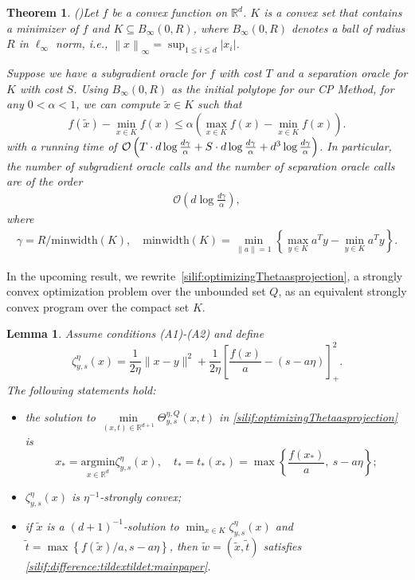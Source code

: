 \documentclass[11pt,letterpaper]{article}
\newcommand{\R}{\mathbb{R}}
\newcommand{\norm}[1]{\left\lVert #1 \right\rVert}
\newcommand{\abs}[1]{\left\vert #1 \right\rvert}
\newcommand{\argmin}{\mathrm{argmin}  }
\newcommand{\brac}[1]{\left( #1\right)}
\newtheorem{theorem}[thm]{Theorem}
\newtheorem{lemma}[thm]{Lemma}
\begin{document}
\begin{theorem}(\cite[Theorem~C.1]{jiang2020cuttingplane})\label{theo:jiang} Let $f$ be a convex function on $\R^d$. $K$ is a convex set that contains a minimizer
of $f$ and $K\subseteq B_\infty (0,R)$, where $B_\infty (0,R)$ denotes a ball of radius $R$ in $\ell_\infty$ norm, i.e., $\norm{x}_\infty=\sup_{1\leq i\leq d}\abs{x_i}$. 

Suppose we have a subgradient oracle for $f$ with cost $T$ and a separation oracle for $K$ with cost $S$. Using $B_\infty (0,R)$ as the initial polytope for our CP Method, for any $0< \alpha<1$, we can compute $\tilde x\in K$ such that 
\begin{equation}\label{ineq:opt}
f(\tilde x)-\min_{x \in K} f(x) \le \alpha \left(\max_{x \in K} f(x)-\min_{x \in K} f(x)\right).    
\end{equation}
with a running time of $ {\cal O}\left(T\cdot d \log \frac{d \gamma}{\alpha}+S\cdot  d \log \frac{d \gamma}{\alpha}+d^3\log \frac{d \gamma}{\alpha}\right)$. In particular, the number of subgradient oracle calls and the number of separation oracle calls are of the order 
\begin{align*}
    \mathcal{O}\brac{d \log \frac{d \gamma}{\alpha}}, 
\end{align*}
where
\begin{align*}
    \gamma=R/\mbox{minwidth}(K), \quad \mbox{minwidth}(K)=\min_{\norm{a}=1}\left\{\max_{y\in K}a^Ty-\min_{y\in K}a^Ty\right\}. 
\end{align*}

\end{theorem}


In the upcoming result, we rewrite~\eqref{silif:optimizingThetaasprojection}, a strongly convex optimization problem over the unbounded set $Q$, as an equivalent strongly convex program over the compact set $K$.


\begin{lemma} 
\label{silif:lem:equivopt}
Assume conditions (A1)-(A2) and define  
\begin{equation}
\label{silif:def:zeta}
     \zeta^{\eta}_{y,s}(x)= \frac{1}{2\eta}\|x-y\|^2+ \frac{1}{2\eta}\left[ \frac{f(x)}{a} - (s - a\eta)\right]_{+}^2. 
\end{equation}
The following statements hold: 
\begin{itemize}
    \item[(a)] the solution to $\underset{(x,t)\in\R^{d+1}}{\min} \Theta^{\eta,Q}_{y,s}(x,t)$ in \eqref{silif:optimizingThetaasprojection} is 
\[
x_* =\underset{x\in\R^d}{\argmin} \zeta^{\eta}_{y,s}(x), \quad
t_*=t_*(x_*)= \max\left\{ \frac{f(x_*)}{a},~ s - a\eta \right\};
\]
    \item[(b)]  $\zeta^{\eta}_{y,s}(x)$ is $\eta^{-1}$-strongly convex;
    \item[(c)] if $\tilde{x}$ is a $(d+1)^{-1}$-solution to $\min_{x\in K} \zeta^{\eta}_{y,s}(x)$ and $\tilde{t}=\max\left\{ f(\tilde{x})/a, s - a\eta \right\}$, then $\tilde{w}=(\tilde{x},\tilde{t})$ satisfies \eqref{silif:difference:tildextildet:mainpaper}.
\end{itemize}
\end{lemma}
\end{document}
